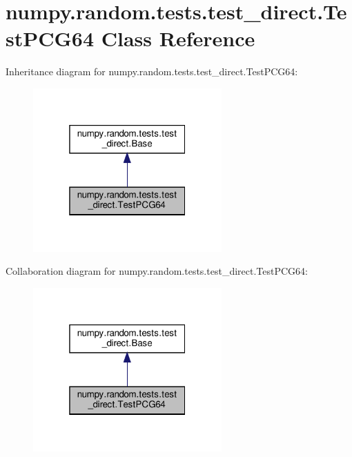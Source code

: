 \hypertarget{classnumpy_1_1random_1_1tests_1_1test__direct_1_1TestPCG64}{}\section{numpy.\+random.\+tests.\+test\+\_\+direct.\+Test\+P\+C\+G64 Class Reference}
\label{classnumpy_1_1random_1_1tests_1_1test__direct_1_1TestPCG64}


Inheritance diagram for numpy.\+random.\+tests.\+test\+\_\+direct.\+Test\+P\+C\+G64\+:
\nopagebreak
\begin{figure}[H]
\begin{center}
\leavevmode
\includegraphics[width=205pt]{classnumpy_1_1random_1_1tests_1_1test__direct_1_1TestPCG64__inherit__graph}
\end{center}
\end{figure}


Collaboration diagram for numpy.\+random.\+tests.\+test\+\_\+direct.\+Test\+P\+C\+G64\+:
\nopagebreak
\begin{figure}[H]
\begin{center}
\leavevmode
\includegraphics[width=205pt]{classnumpy_1_1random_1_1tests_1_1test__direct_1_1TestPCG64__coll__graph}
\end{center}
\end{figure}
